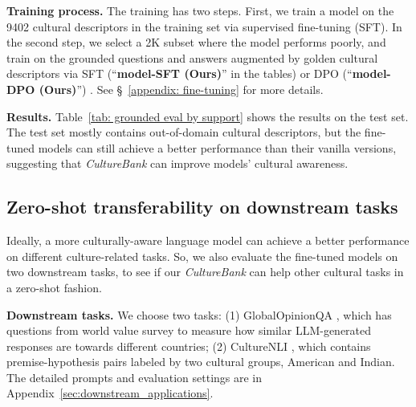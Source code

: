 \documentclass{article} %
\newcommand{\wyshi}[1]{\textcolor{red}{[#1 --Weiyan]}}
\newcommand{\ryan}[1]{\textcolor{magenta}{[#1 --Ryan]}}
\newcommand{\dataname}{\textit{CultureBank}\xspace}
\begin{document}
\noindent\textbf{Training process.} The training has two steps. First, we train a model on the 9402 cultural descriptors in the training set via supervised fine-tuning (SFT). In the second step, we select a 2K subset where the model performs poorly, and train on the grounded questions and answers augmented by golden cultural descriptors via SFT (``\textbf{model-SFT (Ours)}'' in the tables) or DPO \citep{rafailov2024direct} (``\textbf{model-DPO (Ours)}'') . See \S~\ref{appendix: fine-tuning} for more details.   %

\noindent\textbf{Results.} Table~\ref{tab: grounded eval by support} shows the results on the test set. The test set mostly contains out-of-domain cultural descriptors, but the fine-tuned models can still  achieve a better performance than their vanilla versions, suggesting that \dataname can improve models' cultural awareness. %

\subsection{Zero-shot transferability on downstream tasks}
Ideally, a more culturally-aware language model can achieve a better performance on different culture-related tasks. So, we also evaluate the fine-tuned models on two downstream tasks, to see if our \dataname can help other cultural tasks in a zero-shot fashion. 

\noindent\textbf{Downstream tasks.} We choose two tasks: (1) GlobalOpinionQA \citep{Durmus}, which has questions from world value survey \citep{inglehart2000world} to measure how similar LLM-generated responses are towards different countries; (2) CultureNLI \citep{huang2023culturally}, which contains
premise-hypothesis pairs labeled by two cultural groups,  American and Indian. The detailed prompts and evaluation settings are in Appendix~\ref{sec:downstream_applications}.
\end{document}
